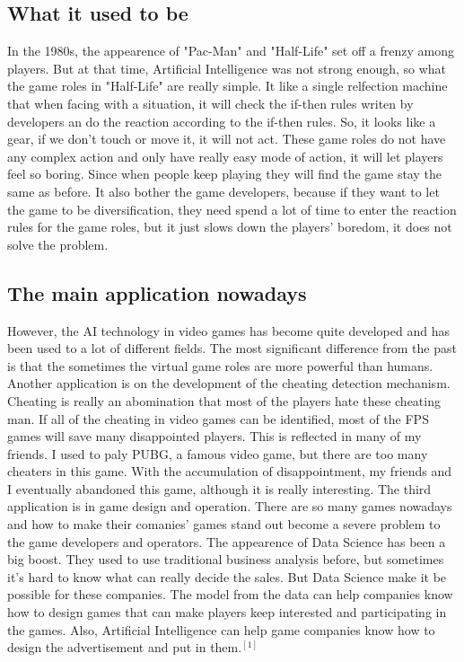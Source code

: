 \documentclass[12pt]{article}
\begin{document}
        \subsection{What it used to be}
            In the 1980s, the appearence of "Pac-Man" and "Half-Life" set off a frenzy among players.
            But at that time, Artificial Intelligence was not strong enough, so what the game roles
            in "Half-Life" are really simple. It like a single relfection machine that when facing
            with a situation, it will check the if-then rules writen by developers an do the reaction
            according to the if-then rules. So, it looks like a gear, if we don't touch or move it,
            it will not act. These game roles do not have any complex action and only have really
            easy mode of action, it will let players feel so boring. Since when people keep playing
            they will find the game stay the same as before. It also bother the game developers,
            because if they want to let the game to be diversification, they need spend a lot of
            time to enter the reaction rules for the game roles, but it just slows down the players'
            boredom, it does not solve the problem.
        \subsection{The main application nowadays}
            However, the AI technology in video games has become quite developed and has been used
            to a lot of different fields. The most significant difference from the past is that the
            sometimes the virtual game roles are more powerful than humans.
            Another application is on the development of the cheating detection mechanism. Cheating
            is really an abomination that most of the players hate these cheating man. If all of
            the cheating in video games can be identified, most of the FPS games will save many
            disappointed players. This is reflected in many of my friends. I used to paly PUBG,
            a famous video game, but there are too many cheaters in this game. With the accumulation
            of disappointment, my friends and I eventually abandoned this game, although it is
            really interesting.
            The third application is in game design and operation. There are so many games nowadays
            and how to make their comanies' games stand out become a severe problem to the game
            developers and operators. The appearence of Data Science has been a big boost. They
            used to use traditional business analysis before, but sometimes it's hard to know what
            can really decide the sales. But Data Science make it be possible for these companies.
            The model from the data can help companies know how to design games that can make
            players keep interested and participating in the games. Also, Artificial Intelligence
            can help game companies know how to design the advertisement and put in them$.^{[1]}$
\end{document}
